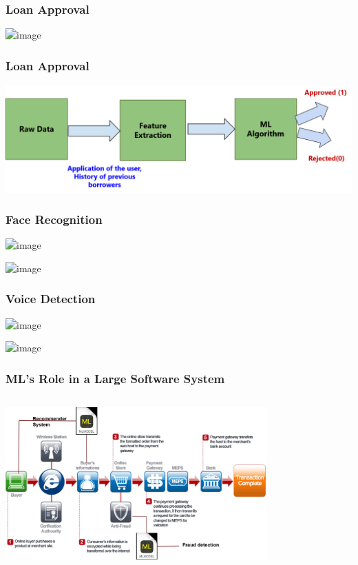 \documentclass[aspectratio=169,14pt]{beamer}
\begin{document}
\begin{frame}
\frametitle{Loan Approval}
\centering
	\includegraphics<2>[width=15cm]{Images/AAv_Picture19.png}
\end{frame}

\begin{frame}
\frametitle{Loan Approval}
\centering
	\includegraphics[width=15cm]{Images/AAv_Picture20.png}
\end{frame}

\begin{frame}
\frametitle{Face Recognition}
\begin{overlayarea}{14cm}{11cm}
	\includegraphics<2->[width=11cm]{Images/AAv_Picture21.png}

\includegraphics<3->[width=12cm]{Images/AAv_Picture21_1.png}
\end{overlayarea}
\end{frame}


\begin{frame}
\frametitle{Voice Detection}
\begin{overlayarea}{14cm}{11cm}
	\includegraphics<2->[width=11cm]{Images/AAv_Picture22.png}

\includegraphics<3->[width=12cm]{Images/AAv_Picture22_1.png}
\end{overlayarea}
\end{frame}



\begin{frame}
\frametitle{ML's Role in a Large Software System}
\begin{columns}
\column{0.65\paperwidth}
	\includegraphics[width=10cm]{Images/AAv_Picture23.png}
\column{0.25\paperwidth}
\end{columns}
\end{frame}

{\1
\begin{frame}
\end{frame}
}
\end{document}
